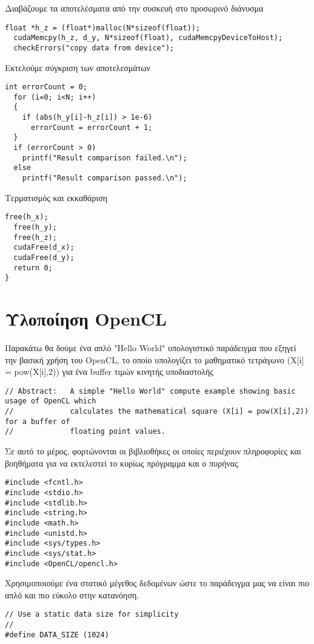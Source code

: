 Διαβάζουμε τα αποτελέσματα από την συσκευή στο προσωρινό διάνυσμα
\begin{lstlisting}[basicstyle=\scriptsize]  
  float *h_z = (float*)malloc(N*sizeof(float));
  cudaMemcpy(h_z, d_y, N*sizeof(float), cudaMemcpyDeviceToHost);
  checkErrors("copy data from device");
\end{lstlisting}
Εκτελούμε σύγκριση των αποτελεσμάτων
\begin{lstlisting}[basicstyle=\scriptsize]  
  int errorCount = 0;
  for (i=0; i<N; i++)
  {
    if (abs(h_y[i]-h_z[i]) > 1e-6)
      errorCount = errorCount + 1;
  }
  if (errorCount > 0)
    printf("Result comparison failed.\n");
  else
    printf("Result comparison passed.\n");
\end{lstlisting}
Τερματισμός και εκκαθάριση
\begin{lstlisting}[basicstyle=\scriptsize]  
  free(h_x);
  free(h_y);
  free(h_z);
  cudaFree(d_x);
  cudaFree(d_y);
  return 0;
}
\end{lstlisting}


\section{Υλοποίηση OpenCL}

Παρακάτω θα δούμε ένα απλό "Hello World" υπολογιστικό παράδειγμα που εξηγεί την βασική χρήση του OpenCL, το οποίο υπολογίζει το μαθηματικό τετράγωνο (X[i] = pow(X[i],2)) για ένα buffer τιμών κινητής υποδιαστολής\cite{code-2}

\begin{lstlisting}[basicstyle=\scriptsize]
// Abstract:   A simple "Hello World" compute example showing basic usage of OpenCL which
//             calculates the mathematical square (X[i] = pow(X[i],2)) for a buffer of
//             floating point values.
\end{lstlisting}

Σε αυτό το μέρος, φορτώνονται οι βιβλιοθήκες οι οποίες περιέχουν πληροφορίες και βοηθήματα για να εκτελεστεί το κυρίως πρόγραμμα και ο πυρήνας 
\begin{lstlisting}[basicstyle=\scriptsize] 
#include <fcntl.h>
#include <stdio.h>
#include <stdlib.h>
#include <string.h>
#include <math.h>
#include <unistd.h>
#include <sys/types.h>
#include <sys/stat.h>
#include <OpenCL/opencl.h>
\end{lstlisting}
 
Χρησιμοποιούμε ένα στατικό μέγεθος δεδομένων ώστε το παράδειγμα μας να είναι πιο απλό και πιο εύκολο στην κατανόηση.
\begin{lstlisting}[basicstyle=\scriptsize]
// Use a static data size for simplicity
//
#define DATA_SIZE (1024)
\end{lstlisting}

